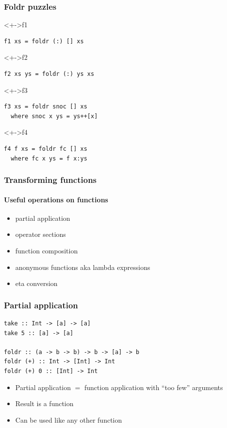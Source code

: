 \documentclass{beamer}
\begin{document}
\begin{frame}[fragile]
  \frametitle{Foldr puzzles}
  \begin{block}<+->{f1}
\begin{verbatim}
f1 xs = foldr (:) [] xs
\end{verbatim}
  \end{block}
  \begin{block}<+->{f2}
\begin{verbatim}
f2 xs ys = foldr (:) ys xs
\end{verbatim}
  \end{block}
  \begin{block}<+->{f3}
\begin{verbatim}
f3 xs = foldr snoc [] xs
  where snoc x ys = ys++[x]
\end{verbatim}
  \end{block}
  \begin{block}<+->{f4}
\begin{verbatim}
f4 f xs = foldr fc [] xs
  where fc x ys = f x:ys
\end{verbatim}
  \end{block}
\end{frame}
\begin{frame}
  \frametitle{Transforming functions}
  \framesubtitle{Useful operations on functions}
  \begin{itemize}
  \item partial application
  \item operator sections
  \item function composition
  \item anonymous functions aka lambda expressions
  \item eta conversion
  \end{itemize}
\end{frame}
\begin{frame}[fragile]
  \frametitle{Partial application}
\begin{verbatim}
take :: Int -> [a] -> [a]
take 5 :: [a] -> [a]

foldr :: (a -> b -> b) -> b -> [a] -> b
foldr (+) :: Int -> [Int] -> Int
foldr (+) 0 :: [Int] -> Int
\end{verbatim}
  \begin{itemize}
  \item Partial application $=$ function application with ``too few'' arguments
  \item Result is a function
  \item Can be used like any other function
  \end{itemize}
\end{frame}
\end{document}
